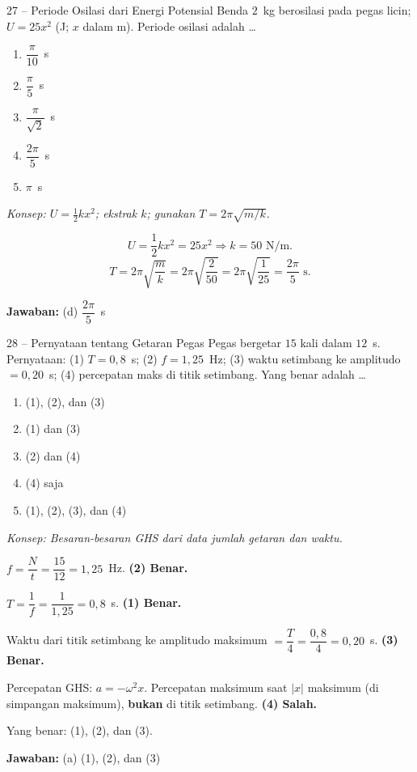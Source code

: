 \documentclass[11pt]{article}
\newcommand{\jawaban}[1]{%
  \noindent\colorbox{gold!30}{\parbox{\dimexpr\linewidth-2\fboxsep\relax}{%
    \textbf{Jawaban:} #1}}\par\smallskip}
\newcommand{\konsep}[1]{\textit{Konsep: #1.}\par\smallskip}
\newenvironment{pil}{%
  \begin{enumerate}[label=(\alph*),leftmargin=*,itemsep=1pt,topsep=3pt]}%
  {\end{enumerate}}
\begin{document}
\begin{soal}{27 -- Periode Osilasi dari Energi Potensial}
Benda $2$~kg berosilasi pada pegas licin; $U=25x^2$ (J; $x$ dalam m). Periode osilasi
adalah \ldots
\begin{pil}
  \item $\dfrac{\pi}{10}$~s \item $\dfrac{\pi}{5}$~s \item $\dfrac{\pi}{\sqrt{2}}$~s
  \item $\dfrac{2\pi}{5}$~s \item $\pi$~s
\end{pil}
\end{soal}
\begin{pembox}
\konsep{$U=\tfrac12kx^2$; ekstrak $k$; gunakan $T=2\pi\sqrt{m/k}$}
\[
U = \frac{1}{2}kx^2 = 25x^2 \Rightarrow k = 50\text{ N/m}.
\]
\[
T = 2\pi\sqrt{\frac{m}{k}} = 2\pi\sqrt{\frac{2}{50}} = 2\pi\sqrt{\frac{1}{25}} = \frac{2\pi}{5}\text{ s}.
\]
\jawaban{(d) $\dfrac{2\pi}{5}$~s}
\end{pembox}

\begin{soal}{28 -- Pernyataan tentang Getaran Pegas}
Pegas bergetar $15$ kali dalam $12$~s. Pernyataan:
(1) $T=0{,}8$~s; (2) $f=1{,}25$~Hz; (3) waktu setimbang ke amplitudo $=0{,}20$~s;
(4) percepatan maks di titik setimbang. Yang benar adalah \ldots
\begin{pil}
  \item (1), (2), dan (3) \item (1) dan (3)
  \item (2) dan (4) \item (4) saja \item (1), (2), (3), dan (4)
\end{pil}
\end{soal}
\begin{pembox}
\konsep{Besaran-besaran GHS dari data jumlah getaran dan waktu}
$f = \dfrac{N}{t} = \dfrac{15}{12} = 1{,}25$~Hz. \quad\textbf{(2) Benar.}

$T = \dfrac{1}{f} = \dfrac{1}{1{,}25} = 0{,}8$~s. \quad\textbf{(1) Benar.}

Waktu dari titik setimbang ke amplitudo maksimum $= \dfrac{T}{4} = \dfrac{0{,}8}{4} = 0{,}20$~s. \quad\textbf{(3) Benar.}

Percepatan GHS: $a=-\omega^2x$. Percepatan maksimum saat $|x|$ maksimum (di simpangan maksimum), \textbf{bukan} di titik setimbang. \quad\textbf{(4) Salah.}

Yang benar: (1), (2), dan (3).
\jawaban{(a) (1), (2), dan (3)}
\end{pembox}
\end{document}
